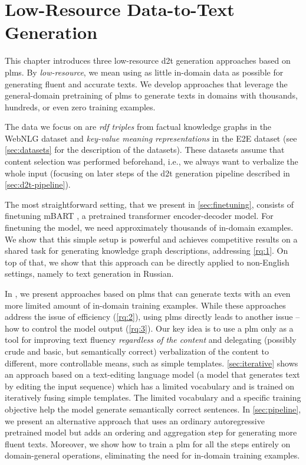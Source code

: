 \chapter{Low-Resource Data-to-Text Generation}
\label{chap:low-res}

This chapter introduces three low-resource \ac{d2t} generation approaches based on \acp{plm}. By \emph{low-resource}, we mean using as little in-domain data as possible for generating fluent and accurate texts. We develop approaches that leverage the general-domain pretraining of \acp{plm} to generate texts in domains with thousands, hundreds, or even zero training examples.

The data we focus on are \emph{\acs{rdf} triples} from factual knowledge graphs in the WebNLG dataset and \emph{key-value meaning representations} in the E2E dataset (see \autoref{sec:datasets} for the description of the datasets). These datasets assume that content selection was performed beforehand, i.e., we always want to verbalize the whole input (focusing on later steps of the \ac{d2t} generation pipeline described in \autoref{sec:d2t-pipeline}).

The most straightforward setting, that we present in \autoref{sec:finetuning}, consists of finetuning mBART \cite{liuMultilingualDenoisingPretraining2020}, a pretrained transformer encoder-decoder model. For finetuning the model, we need approximately thousands of in-domain examples. We show that this simple setup is powerful and achieves competitive results on a shared task for generating knowledge graph descriptions, addressing \ref{rq:1}. On top of that, we show that this approach can be directly applied to non-English settings, namely to text generation in Russian.

In , we present approaches based on \acp{plm} that can generate texts with an even more limited amount of in-domain training examples. While these approaches address the issue of efficiency (\ref{rq:2}), using \acp{plm} directly leads to another issue -- how to control the model output (\ref{rq:3}). Our key idea is to use a \ac{plm} only as a tool for improving text fluency \emph{regardless of the content} and delegating (possibly crude and basic, but semantically correct) verbalization of the content to different, more controllable means, such as simple templates. \autoref{sec:iterative} shows an approach based on a text-editing language model (a model that generates text by editing the input sequence) which has a limited vocabulary and is trained on iteratively fusing simple templates. The limited vocabulary and a specific training objective help the model generate semantically correct sentences. In \autoref{sec:pipeline}, we present an alternative approach that uses an ordinary autoregressive pretrained model but adds an ordering and aggregation step for generating more fluent texts. Moreover, we show how to train a \ac{plm} for all the steps entirely on domain-general operations, eliminating the need for in-domain training examples.

